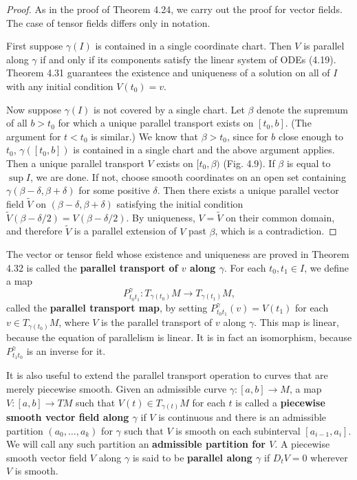 \begin{proof}
As in the proof of Theorem 4.24, we carry out the proof for vector fields. The case of tensor fields differs only in notation.

First suppose $\gamma(I)$ is contained in a single coordinate chart. Then $V$ is parallel along $\gamma$ if and only if its components satisfy the linear system of ODEs (4.19). Theorem 4.31 guarantees the existence and uniqueness of a solution on all of $I$ with any initial condition $V(t_0) = v$.


Now suppose $\gamma(I)$ is not covered by a single chart. Let $\beta$ denote the supremum of all $b > t_0$ for which a unique parallel transport exists on $[t_0, b]$. (The argument for $t < t_0$ is similar.) We know that $\beta > t_0$, since for $b$ close enough to $t_0$, $\gamma([t_0, b])$ is contained in a single chart and the above argument applies. Then a unique parallel transport $V$ exists on $[t_0, \beta)$ (Fig. 4.9). If $\beta$ is equal to $\sup I$, we are done. If not, choose smooth coordinates on an open set containing $\gamma(\beta - \delta, \beta + \delta)$ for some positive $\delta$. Then there exists a unique parallel vector field $\tilde{V}$ on $(\beta - \delta, \beta + \delta)$ satisfying the initial condition $\tilde{V}(\beta - \delta/2) = V(\beta - \delta/2)$. By uniqueness, $V = \tilde{V}$ on their common domain, and therefore $\tilde{V}$ is a parallel extension of $V$ past $\beta$, which is a contradiction.
\end{proof}

The vector or tensor field whose existence and uniqueness are proved in Theorem 4.32 is called the \textbf{parallel transport of $v$ along $\gamma$}. For each $t_0, t_1 \in I$, we define a map
\begin{equation}
P_{t_0t_1}^\gamma : T_{\gamma(t_0)} M \to T_{\gamma(t_1)} M, \tag{4.22}
\end{equation}
called the \textbf{parallel transport map}, by setting $P_{t_0t_1}^\gamma(v) = V(t_1)$ for each $v \in T_{\gamma(t_0)} M$, where $V$ is the parallel transport of $v$ along $\gamma$. This map is linear, because the equation of parallelism is linear. It is in fact an isomorphism, because $P_{t_1t_0}^\gamma$ is an inverse for it.

It is also useful to extend the parallel transport operation to curves that are merely piecewise smooth. Given an admissible curve $\gamma : [a, b] \to M$, a map $V : [a, b] \to TM$ such that $V(t) \in T_{\gamma(t)} M$ for each $t$ is called a \textbf{piecewise smooth vector field along $\gamma$} if $V$ is continuous and there is an admissible partition $(a_0, \ldots, a_k)$ for $\gamma$ such that $V$ is smooth on each subinterval $[a_{i-1}, a_i]$. We will call any such partition an \textbf{admissible partition for $V$}. A piecewise smooth vector field $V$ along $\gamma$ is said to be \textbf{parallel along $\gamma$} if $D_t V = 0$ wherever $V$ is smooth.

